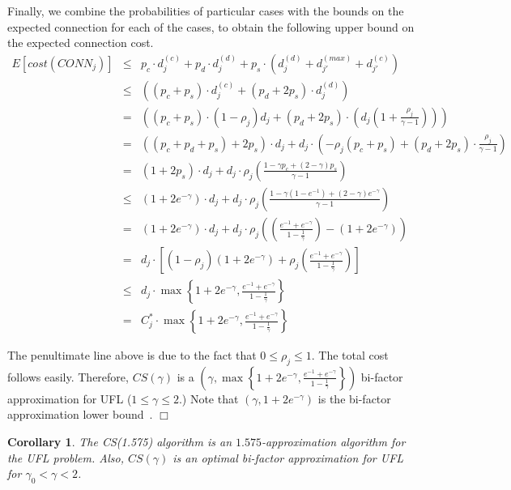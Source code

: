 \documentclass[11pt]{article}
\newtheorem{corollary}[theorem]{\indent Corollary}
\newcommand{\qed}{\nopagebreak \hfill $\Box$}
\newenvironment{proof}{\par \noindent {\em Proof:}}{\qed \par}
\begin{document}
\begin{proof}
Finally, we combine the probabilities of particular cases
with the bounds on the expected connection for each of the cases, 
to obtain the following upper bound on the expected connection cost.
\begin{eqnarray*}
  E[cost(CONN_j)] & \leq &p_c \cdot d_j^{(c)} + p_d \cdot d_j^{(d)} + p_s \cdot (d_{j}^{(d)} + d_{j'}^{(max)} + d_{j'}^{(c)})\\
  & \leq & \left( (p_c + p_s) \cdot d_j^{(c)} + (p_d + 2p_s) \cdot d_j^{(d)} \right)\\
  & = & \left( (p_c + p_s) \cdot (1- \rho_j) d_j + (p_d + 2p_s) \cdot (d_j (1+ \frac{\rho_j}{\gamma -1})) \right)\\
  & = &((p_c + p_d + p_s) + 2p_s) \cdot d_j + d_j \cdot \left( -\rho_j(p_c + p_s) + (p_d + 2p_s) \cdot \frac{\rho_j}{\gamma -1} \right) \\
  & = &(1 + 2p_s) \cdot d_j +  d_j \cdot \rho_j \left( \frac{1-\gamma p_c + (2 - \gamma)p_s}{\gamma-1} \right)\\
  & \leq &(1 + 2e^{-\gamma}) \cdot d_j +  d_j \cdot \rho_j \left( \frac{1-\gamma (1-e^{-1}) + (2 - \gamma)e^{-\gamma}}{\gamma-1} \right)\\
  & = &(1 + 2e^{-\gamma}) \cdot d_j +  d_j \cdot \rho_j \left( \left( \frac{e^{-1}+e^{-\gamma}}{1 - \frac{1}{\gamma}}\right) - \left(1 + 2e^{-\gamma} \right) \right)\\
  & = &d_j \cdot \left[ (1 - \rho_j)\left(1 + 2e^{-\gamma} \right) + \rho_j \left( \frac{e^{-1}+e^{-\gamma}}{1 - \frac{1}{\gamma}} \right) \right] \\
  & \leq &d_j \cdot \max\left\{1 + 2e^{-\gamma}, \frac{e^{-1}+e^{-\gamma}}{1 - \frac{1}{\gamma}}\right\} \\
  & = &C^*_j \cdot \max\left\{1 + 2e^{-\gamma}, \frac{e^{-1}+e^{-\gamma}}{1 - \frac{1}{\gamma}}\right\}
\end{eqnarray*}




 The penultimate line above is due to the fact that $ 0 \leq \rho_j \leq 1$. 
 The total cost follows easily. Therefore, $CS(\gamma)$ is a 
 $\left(\gamma, \max\left\{1 + 2e^{-\gamma}, \frac{e^{-1}+e^{-\gamma}}{1 - \frac{1}{\gamma}}\right\} \right)$ 
 bi-factor approximation for UFL ($1 \leq \gamma \leq 2$.) 
 Note that $\left(\gamma, 1 + 2e^{-\gamma} \right)$ is the bi-factor approximation lower bound~\cite{DBLP:journals/jacm/JainMMSV03,DBLP:journals/jal/GuhaK99}.
\end{proof}

\begin{corollary}
The CS(1.575) algorithm is an $1.575$-approximation algorithm
for the UFL problem. 
Also, $CS(\gamma)$ is an optimal bi-factor approximation for UFL for $\gamma_0 < \gamma < 2$.
\end{corollary}
\end{document}
